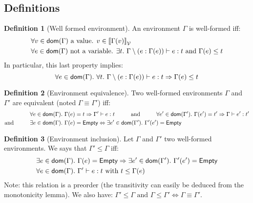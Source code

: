\documentclass[a4paper]{article}
\theoremstyle{definition}
\newtheorem{definition}{Definition}
\begin{document}
      \subsection{Definitions}
      
      \begin{definition}[Well formed environment]
        An environment $\Gamma$ is well-formed iff:
        \begin{align*}
          &\forall v \in \textsf{dom}(\Gamma) \text{ a value. } v \in {\llbracket \Gamma(v) \rrbracket}_{\mathcal{V}}\\
          &\forall e \in \textsf{dom}(\Gamma) \text{ not a variable. } \exists t.\ \Gamma\setminus(e:\Gamma(e)) \vdash e : t \text{ and } \Gamma(e) \leq t
        \end{align*}
        In particular, this last property implies:
        \[
          \forall e \in \dom \Gamma.\ \forall t.\ \Gamma\setminus(e:\Gamma(e)) \vdash e : t \Rightarrow \Gamma(e) \leq t
        \]
      \end{definition}

      \begin{definition}[Environment equivalence]
        Two well-formed environments $\Gamma$ and $\Gamma'$ are equivalent (noted $\Gamma \equiv \Gamma'$) iff:
        \begin{align*} 
          &\forall e \in \dom \Gamma.\ \Gamma(e)=t \Rightarrow \Gamma' \vdash e:t \hspace{1cm} \text{and} \hspace{1cm}
          \forall e' \in \dom {\Gamma'}.\ \Gamma(e')=t' \Rightarrow \Gamma \vdash e':t' \\
          \text{and} \hspace{1cm} &\exists e\in \dom \Gamma.\ \Gamma(e)=\Empty \Leftrightarrow \exists e'\in \dom {\Gamma'}.\ \Gamma'(e')=\Empty
        \end{align*}
      \end{definition}
    
      \begin{definition}[Environment inclusion]
        Let $\Gamma$ and $\Gamma'$ two well-formed environments. We says that $\Gamma' \leq \Gamma$ iff:
        \begin{align*}
          &\exists e\in \textsf{dom}(\Gamma).\ \Gamma(e)=\textsf{Empty} \Rightarrow \exists e'\in \textsf{dom}(\Gamma').\ \Gamma'(e')=\textsf{Empty}\\
          &\forall e \in \textsf{dom}(\Gamma).\ \Gamma' \vdash e : t \text{ with } t \leq \Gamma(e)
        \end{align*}
        Note: this relation is a preorder (the transitivity can easily be deduced from the monotonicity lemma).
        We also have: $\Gamma' \leq \Gamma \text{ and } \Gamma \leq \Gamma' \Leftrightarrow \Gamma \equiv \Gamma'$.
      \end{definition}
    
\end{document}
